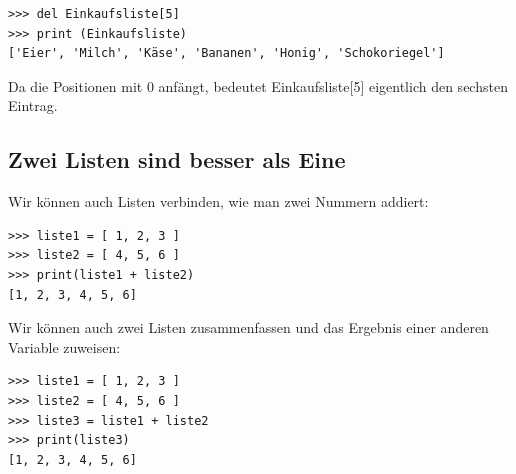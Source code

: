 \begin{Verbatim}[frame=single]
>>> del Einkaufsliste[5]
>>> print (Einkaufsliste)
['Eier', 'Milch', 'Käse', 'Bananen', 'Honig', 'Schokoriegel']
\end{Verbatim}

Da die Positionen mit 0 anfängt, bedeutet Einkaufsliste[5] eigentlich den sechsten Eintrag.

\subsection*{\color{BrickRed}Zwei Listen sind besser als Eine}

Wir können auch Listen verbinden, wie man zwei Nummern addiert:

\begin{Verbatim}[frame=single]
>>> liste1 = [ 1, 2, 3 ]
>>> liste2 = [ 4, 5, 6 ]
>>> print(liste1 + liste2)
[1, 2, 3, 4, 5, 6]
\end{Verbatim}

\noindent
Wir können auch zwei Listen zusammenfassen und das Ergebnis einer anderen Variable zuweisen:

\begin{Verbatim}[frame=single]
>>> liste1 = [ 1, 2, 3 ]
>>> liste2 = [ 4, 5, 6 ]
>>> liste3 = liste1 + liste2
>>> print(liste3)
[1, 2, 3, 4, 5, 6]
\end{Verbatim}

